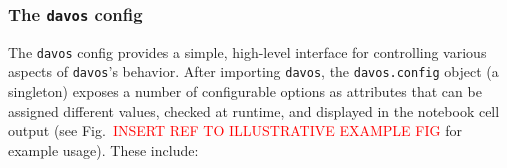 \documentclass[preprint,12pt,a4paper]{elsarticle}
\begin{document}
\subsubsection{The \texttt{davos} config}\label{subsec:config}
The \texttt{davos} config provides a simple, high-level interface for controlling various aspects of \texttt{davos}'s behavior. After importing \texttt{davos}, the \texttt{davos.config} object (a singleton) exposes a number of configurable options as attributes that can be assigned different values, checked at runtime, and displayed in the notebook cell output (see Fig.~\textcolor{red}{INSERT REF TO ILLUSTRATIVE EXAMPLE FIG} for example usage). These include:
\end{document}
